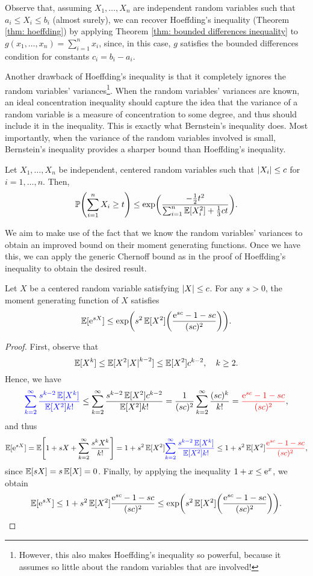Observe that, assuming $X_1, \dots, X_n$ are independent random variables such that $a_i \leq X_i \leq b_i$ (almost surely), we can recover Hoeffding's inequality (Theorem \ref{thm: hoeffding}) by applying Theorem \ref{thm: bounded differences inequality} to $g(x_1, \dots, x_n) = \sum_{i=1}^n x_i$, since, in this case, $g$ satisfies the bounded differences condition for constants $c_i = b_i - a_i$.

Another drawback of Hoeffding's inequality is that it completely ignores the random variables' variances\footnote{However, this also makes Hoeffding's inequality so powerful, because it assumes so little about the random variables that are involved!}. When the random variables' variances are known, an ideal concentration inequality should capture the idea that the variance of a random variable is a measure of concentration to some degree, and thus should include it in the inequality. This is exactly what Bernstein's inequality does. Most importantly, when the variance of the random variables involved is small, Bernstein's inequality provides a sharper bound than Hoeffding's inequality.

\begin{theorem}
\label{thm: bernstein}
Let $X_1, \dots, X_n$ be independent, centered random variables such that $\abs{X_i} \leq c$ for $i = 1, \dots, n$. Then,
\[
    \Prob\left(\sum_{i=1}^n X_i \geq t\right) \leq \exp(\frac{-\frac{1}{2}t^2}{\sum_{i=1}^n \Exp[X_i^2] + \frac{1}{3}ct}).
\]
\end{theorem}

We aim to make use of the fact that we know the random variables' variances to obtain an improved bound on their moment generating functions. Once we have this, we can apply the generic Chernoff bound as in the proof of Hoeffding's inequality to obtain the desired result.

\begin{lemma}
\label{lem: bernstein}
Let $X$ be a centered random variable satisfying $\abs{X} \leq c$. For any $s > 0$, the moment generating function of $X$ satisfies
\[
    \Exp[\e^{sX}] \leq \exp(s^2 \Exp[X^2] \left(\frac{\e^{sc} - 1 - sc}{(sc)^2} \right)).
\]
\end{lemma}

\begin{proof}
First, observe that
\[
    \operatorname{\mathbb{E}}[X^k] \leq \operatorname{\mathbb{E}}[X^2 \abs{X}^{k-2}] \leq \operatorname{\mathbb{E}}[X^2] c^{k-2}, \quad k \geq 2.
\]
Hence, we have
\[
    {\color{blue} \sum_{k=2}^{\infty} \frac{s^{k-2} \operatorname{\mathbb{E}}[X^k]}{\operatorname{\mathbb{E}}[X^2] k!}} \leq \sum_{k=2}^{\infty} \frac{s^{k-2} \operatorname{\mathbb{E}}[X^2] c^{k-2}}{\operatorname{\mathbb{E}}[X^2] k!} = \frac{1}{(sc)^2} \sum_{k=2}^{\infty} \frac{(sc)^k}{k!} = {\color{red} \frac{\mathrm{e}^{sc} - 1 - sc}{(sc)^2}},
\]
and thus
\[
    \Exp[\e^{sX}] = \Exp\left[1 + sX + \sum_{k=2}^{\infty} \frac{s^k X^k}{k!}\right] = 1 + s^2 \Exp[X^2] {\color{blue} \sum_{k=2}^{\infty} \frac{s^{k-2} \Exp[X^k]}{\Exp[X^2] k!}} \leq 1 + s^2 \Exp[X^2] {\color{red} \frac{\e^{sc} - 1 - sc}{(sc)^2}},
\]
since $\operatorname{\mathbb{E}}[sX] = s \operatorname{\mathbb{E}}[X] = 0$. Finally, by applying the inequality $1 + x \leq \mathrm{e}^x$, we obtain
\[
    \Exp[\e^{sX}] \leq 1 + s^2 \Exp[X^2] \frac{\e^{sc} - 1 - sc}{(sc)^2} \leq \exp(s^2 \Exp[X^2] \left(\frac{\e^{sc} - 1 - sc}{(sc)^2} \right)). \qedhere
\]
\end{proof}

